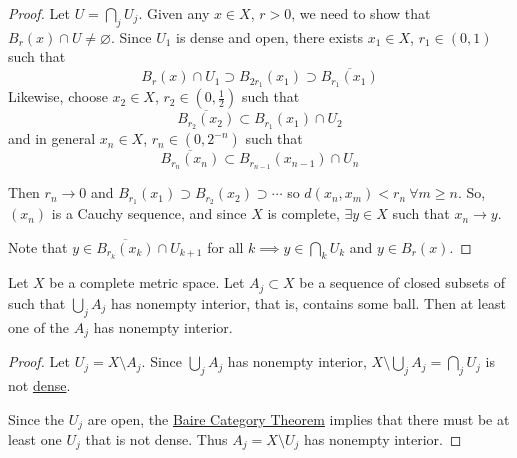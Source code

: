\documentclass{article}
\renewcommand{\emptyset}{\varnothing}
\begin{document}
\begin{proof}
    Let $U = \bigcap_j U_j$. Given any $x \in X$, $r > 0$, we need to show that $B_r(x) \cap U \neq \emptyset$.
    Since $U_1$ is dense and open, there exists $x_1 \in X$, $r_1 \in (0, 1)$ such that
    \begin{equation*}
        B_r(x) \cap U_1 \supset B_{2r_1}(x_1) \supset \overline{B_{r_1}(x_1)}
    \end{equation*}
    Likewise, choose $x_2 \in X$, $r_2 \in (0, \frac{1}{2})$ such that
    \begin{equation*}
        \overline{B_{r_2}(x_2)} \subset B_{r_1}(x_1) \cap U_2
    \end{equation*}
    and in general $x_n \in X$, $r_n \in (0, 2^{-n})$ such that
    \begin{equation*}
        \overline{B_{r_n}(x_n)} \subset B_{r_{n-1}}(x_{n-1}) \cap U_n
    \end{equation*}

    Then $r_n \to 0$ and $B_{r_1}(x_1) \supset B_{r_2}(x_2) \supset \dotsb$ so $d(x_n, x_m) < r_n \ \forall m \geq n$.
    So, $(x_n)$ is a Cauchy sequence, and since $X$ is complete, $\exists y \in X$ such that $x_n \to y$.

    Note that $y \in \overline{B_{r_k}(x_k)} \cap U_{k+1}$ for all $k \implies y \in \bigcap_k U_k$ and $y \in B_r(x)$.
\end{proof}

\begin{cor}
    Let $X$ be a complete metric space.
    Let $A_j \subset X$ be a sequence of closed subsets of such that $\bigcup_j A_j$ has nonempty interior, that is, contains some ball.
    Then at least one of the $A_j$ has nonempty interior.
\end{cor}

\begin{proof}
    Let $U_j = X \setminus A_j$.
    Since $\bigcup_j A_j$ has nonempty interior, $X \setminus \bigcup_j A_j = \bigcap_j U_j$ is not \hyperlink{def:dense}{dense}.

    Since the $U_j$ are open, the \hyperlink{thm:baireCategory}{Baire Category Theorem} implies that there must be at least one $U_j$ that is not dense.
    Thus $A_j = X \setminus U_j$ has nonempty interior.
\end{proof}
\end{document}
